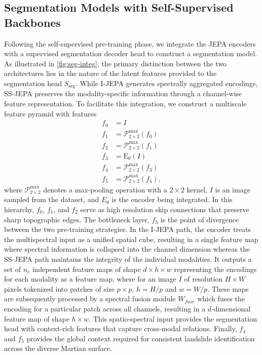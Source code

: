 \subsection{Segmentation Models with Self-Supervised Backbones}
\label{sec:methodology_segmentation}
Following the self-supervised pre-training phase, we integrate the JEPA encoders with a supervised segmentation decoder head to construct a segmentation model. As illustrated in \cref{fig:seg-integ}, the primary distinction between the two architectures lies in the nature of the latent features provided to the segmentation head  \( S_{\text{seg}}\). While I-JEPA generates spectrally aggregated encodings, SS-JEPA preserves the modality-specific information through a channel-wise feature representation. To facilitate this integration, we construct a multiscale feature pyramid with features
\begin{align}
	f_0 & = I                                            \\
	f_1 & = \mathcal{P}^\mathrm{max}_{2 \times 2}(f_0)   \\
	f_2 & = \mathcal{P}^\mathrm{max}_{2 \times 2}(f_1)   \\
	f_3 & = \mathrm{E}_\theta(I)                         \\
	f_4 & = \mathcal{P}^\mathrm{max}_{2 \times 2}(f_3)   \\
	f_5 & = \mathcal{P}^\mathrm{max}_{2 \times 2}(f_4) ,
\end{align}
where \( \mathcal{P}^\mathrm{max}_{2 \times 2} \) denotes a max-pooling operation with a \( 2 \times 2 \) kernel, \( I \) is an image sampled from the dataset, and \( E_\theta \) is the encoder being integrated.
In this hierarchy, \(f_0\), \(f_1\), and \(f_2\) serve as high resolution skip connections that preserve sharp topographic edges. The bottleneck layer, \(f_3\) is the point of divergence between the two pre-training strategies. In the I-JEPA path, the encoder treats the multispectral input as a unified spatial cube, resulting in a single feature map where spectral information is collapsed into the channel dimension whereas the SS-JEPA path maintains the integrity of the individual modalities. It outputs a set of \(n_c\) independent feature maps of shape \(d \times h \times w\) representing the encodings for each modality as a feature map, where for an image \( I \) of resolution \( H \times W \) pixels tokenized into patches of size \( p \times p \), \( h = H / p \) and \( w = W / p \). These maps are subsequently processed by a spectral fusion module \(W_{fuse}\) which fuses the encoding for a particular patch across all channels, resulting in a \( d \)-dimensional feature map of shape \( h \times w \). This spatio-spectral input provides the segmentation head with context-rich features that capture cross-modal relations. Finally, \(f_4\) and \(f_5\) provides the global context required for consistent landslide identification across the diverse Martian surface.


